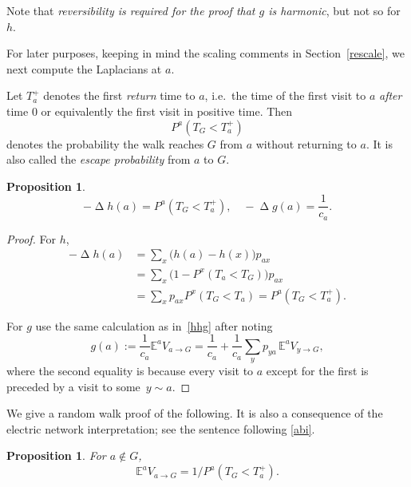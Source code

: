 \documentclass[a4paper]{amsart}
\theoremstyle{plain}
\newtheorem{proposition}[theorem]{Proposition}
\theoremstyle{definition}
\theoremstyle{remark}
\DeclareMathOperator{\lap}{\Delta}
\begin{document}
Note that \emph{reversibility is required for the proof that $ g $ is harmonic}, but not so for $ h $.


\medskip For later purposes, keeping in mind the scaling comments in Section~\ref{rescale}, we next compute the Laplacians at $ a $. 

Let  $ T^+_a $ denotes the first \emph{return} time to $ a $, i.e.\ the time of the first visit to $ a $ \emph{after} time $ 0$ or equivalently the first visit in positive time. Then
 \begin{equation} \label{} 
 P^a (T_G   < T^+_a )
\end{equation}  
denotes the probability the walk reaches $G$ from $ a $ without returning to $  a $.
It is also called the \emph{escape probability} from $ a $ to $G $.


\begin{proposition}
\begin{equation} \label{laphg} 
-\lap h(a) =    P^a(T_G < T^+_a), \quad  -\lap g(a) = \frac{1}{c_a} .
\end{equation} 
\end{proposition}

\begin{proof}
For $ h $, 
\begin{align*}
- \lap h(a) &= \sum_x\big(h(a) -h(x) \big) p_{ax}  \\
& =\sum_x \big(1-P^x(T_a < T_G)\big)p_{ax} \\
&=\sum_x  p_{ax} P^x(T_G < T_a)  
  = P^a(T_G < T^+_a).
\end{align*}
 
\medskip For $ g $ use  the same calculation as in~\eqref{hhg} after noting
\[
g(a)   := \frac{1}{c_a}   \mathbb{E}^a V_{a\to G} = 
  \frac{1}{c_a} +  \frac{1}{c_a}\sum_y p_{ya}\,  \mathbb{E}^a V_{y\to G},
  \]
where the second equality is because every visit to $ a $ except for the first is preceded by a visit to some~$ y \sim a $.
\end{proof} 

We give a random walk proof of the following. 
It  is also a consequence of the electric network interpretation; see the sentence following \eqref{abi}.
\begin{proposition} \label{receq}For $ a \notin G $,
\begin{equation} \label{epr}  
\boxed{
\mathbb{E}^a  V_{a\to G }  = 1/P^a (T_G < T^+_a).
}
\end{equation} 
\end{proposition} 
\end{document}
